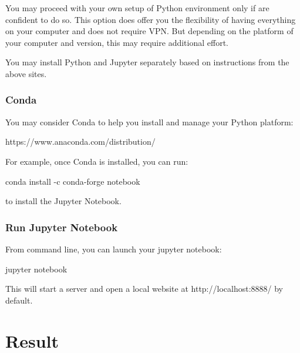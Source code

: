 \documentclass[
  letterpaper,
]{scrbook}
\newenvironment{Shaded}{\begin{snugshade}}{\end{snugshade}}
\newcommand{\NormalTok}[1]{\textcolor[rgb]{0.00,0.23,0.31}{#1}}
\begin{document}
You may proceed with your own setup of Python environment only if are
confident to do so. This option does offer you the flexibility of having
everything on your computer and does not require VPN. But depending on
the platform of your computer and version, this may require additional
effort.

You may install Python and Jupyter separately based on instructions from
the above sites.

\subsubsection*{Conda}\label{conda}

You may consider Conda to help you install and manage your Python
platform:

https://www.anaconda.com/distribution/

For example, once Conda is installed, you can run:

\begin{Shaded}
\begin{Highlighting}[]
\NormalTok{conda install {-}c conda{-}forge notebook}
\end{Highlighting}
\end{Shaded}

to install the Jupyter Notebook.

\subsubsection*{Run Jupyter Notebook}\label{run-jupyter-notebook}

From command line, you can launch your jupyter notebook:

\begin{Shaded}
\begin{Highlighting}[]
\NormalTok{jupyter notebook}
\end{Highlighting}
\end{Shaded}

This will start a server and open a local website at
http://localhost:8888/ by default.

\section*{Result}\label{result}

\end{document}
